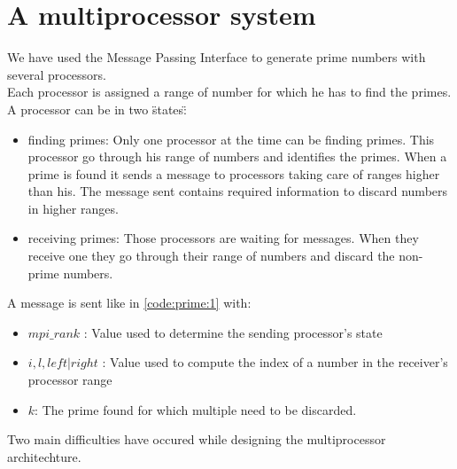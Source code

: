 \newpage\cleardoublepage{}
\section{A multiprocessor system}


We have used the Message Passing Interface to generate prime numbers with several processors. \\ Each processor is assigned a range of number for which he has to find the primes. A processor can be in two \"states\":
\begin{itemize}
	\item{finding primes: }
	Only one processor at the time can be finding primes. This processor go through his range of numbers and identifies the primes. When a prime is found it sends a message to processors taking care of ranges higher than his. The message sent contains required information to discard numbers in higher ranges. 
	\item{receiving primes: }
	Those processors are waiting for messages. When they receive one they go through their range of numbers and discard the non-prime numbers. 

\end{itemize}


A message is sent like in \ref{code:prime:1} with:

\begin{itemize}
	\item{$mpi\_rank$ :}
	Value used to determine the sending processor's state
	
	\item{$i,l, left|right$ :}
	Value used to compute the index of a number in the receiver's processor range
	\item{$k$:} 
	The prime found for which multiple need to be discarded.

\end{itemize}


Two main difficulties have occured while designing the multiprocessor architechture.

